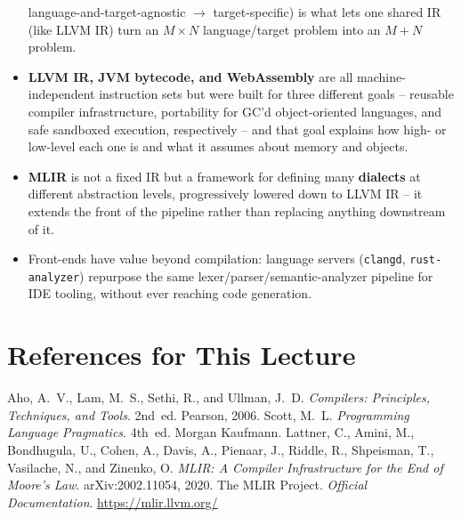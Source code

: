 \documentclass[full-course-notes.tex]{subfiles}
\begin{document}
\begin{takeaways}
\begin{itemize}
  language-and-target-agnostic $\to$ target-specific) is what lets one shared IR (like LLVM IR)
  turn an $M \times N$ language/target problem into an $M + N$ problem.
  \item \textbf{LLVM IR, JVM bytecode, and WebAssembly} are all machine-independent instruction
  sets but were built for three different goals -- reusable compiler infrastructure, portability
  for GC'd object-oriented languages, and safe sandboxed execution, respectively -- and that goal
  explains how high- or low-level each one is and what it assumes about memory and objects.
  \item \textbf{MLIR} is not a fixed IR but a framework for defining many \textbf{dialects} at
  different abstraction levels, progressively lowered down to LLVM IR -- it extends the front of
  the pipeline rather than replacing anything downstream of it.
  \item Front-ends have value beyond compilation: language servers (\texttt{clangd},
  \texttt{rust-analyzer}) repurpose the same lexer/parser/semantic-analyzer pipeline for IDE
  tooling, without ever reaching code generation.
\end{itemize}
\end{takeaways}

\section*{References for This Lecture}
\begin{thebibliography}{99}
 Aho, A.~V., Lam, M.~S., Sethi, R., and Ullman, J.~D. \textit{Compilers:
Principles, Techniques, and Tools}. 2nd~ed. Pearson, 2006.
 Scott, M.~L. \textit{Programming Language Pragmatics}. 4th~ed. Morgan
Kaufmann.
 Lattner, C., Amini, M., Bondhugula, U., Cohen, A., Davis, A., Pienaar, J.,
Riddle, R., Shpeisman, T., Vasilache, N., and Zinenko, O. \textit{MLIR: A Compiler
Infrastructure for the End of Moore's Law}. arXiv:2002.11054, 2020.
 The MLIR Project. \textit{Official Documentation}.
\url{https://mlir.llvm.org/}
\end{thebibliography}
\end{document}
